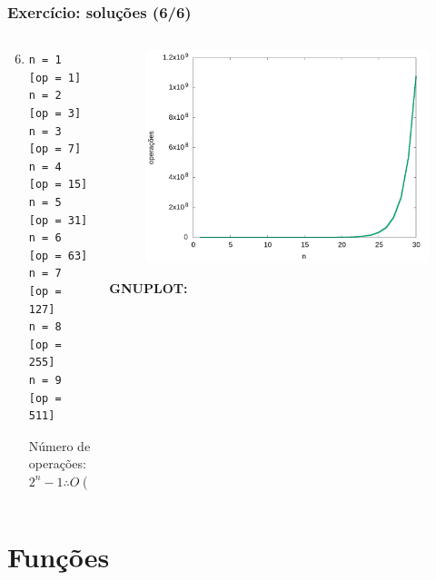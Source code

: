 \documentclass[aspectratio=169]{beamer}
\begin{document}
\begin{frame}[fragile]\frametitle{Exercício: soluções (6/6)}
\begin{columns}[T]
\begin{column}{0.5\linewidth}
\begin{enumerate}
	\setcounter{enumi}{5	}
	\item {\scriptsize}
{\tiny
\begin{verbatim}
n = 1  [op = 1]	
n = 2  [op = 3]
n = 3  [op = 7]
n = 4  [op = 15]
n = 5  [op = 31]
n = 6  [op = 63]
n = 7  [op = 127]
n = 8  [op = 255]
n = 9  [op = 511]
\end{verbatim}
Número de operações: $2^{n}-1 \therefore O(2^{n})$
}
\end{enumerate}
\end{column}
\begin{column}{0.5\linewidth}
\begin{figure}[h]
	\centering
	\includegraphics[height=0.5\paperheight]{contagem/contagem06.jpg}
\end{figure}
{\fontsize{0}{4}\selectfont{}\textbf{GNUPLOT:}

}
\end{column}
\end{columns}
\end{frame}

\section{Funções}
\end{document}

